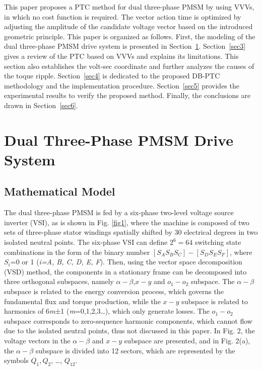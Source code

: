 \documentclass[sn-basic]{sn-jnl}
\theoremstyle{thmstyleone}%
\theoremstyle{thmstyletwo}%
\theoremstyle{thmstylethree}%
\theoremstyle{thmstyleone}%
\begin{document}
This paper proposes a PTC method for dual three-phase PMSM by using VVVs, in which no cost function is required. The vector action time is optimized by adjusting the amplitude of the candidate voltage vector based on the introduced geometric principle. This paper is organized as follows. First, the modeling of the dual three-phase PMSM drive system is presented in Section~\ref{sec2}. Section~\ref{sec3} gives a review of the PTC based on VVVs and explains its limitations. This section also establishes the volt-sec coordinate and further analyzes the causes of the toque ripple. Section~\ref{sec4} is dedicated to the proposed DB-PTC methodology and the implementation procedure. Section~\ref{sec5} provides the experimental results to verify the proposed method. Finally, the conclusions are drawn in Section~\ref{sec6}.

\section{Dual Three-Phase PMSM Drive System}\label{sec2}
\subsection {Mathematical Model}
The dual three-phase PMSM is fed by a six-phase two-level voltage source inverter (VSI), as is shown in Fig. \ref{fig1}, where the machine is composed of two sets of three-phase stator windings spatially shifted by 30 electrical degrees in two isolated neutral points. The six-phase VSI can define $2^6=64$ switching state combinations in the form of the binary number $[S_A S_B S_C]-[S_D S_E S_F]$, where $S_i$=0 or 1 (\textit{i=A, B, C, D, E, F}). Then, using the vector space decomposition (VSD) method\cite{5784326}, the components in a stationary frame can be decomposed into three orthogonal subspaces, namely $\alpha-\beta$,$x-y$ and $o_1-o_2$ subspace. The $\alpha-\beta$ subspace is related to the energy conversion process, which governs the fundamental flux and torque production, while the $x-y$ subspace is related to harmonics of 6\textit{m}±1 (\textit{m}=0,1,2,3…), which only generate losses. The $o_1-o_2$  subspace corresponds to zero-sequence harmonic components, which cannot flow due to the isolated neutral points, thus not discussed in this paper. In Fig. 2, the voltage vectors in the $\alpha-\beta$ and $x-y$ subspace are presented, and in Fig. 2(a), the $\alpha-\beta$ subspace is divided into 12 sectors, which are represented by the symbols $Q_1, Q_2$, …, $Q_{12}$.
\end{document}
